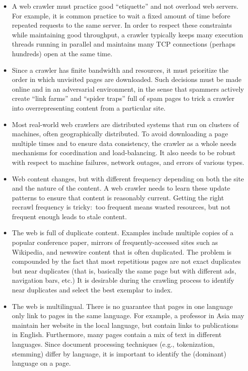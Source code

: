 \begin{itemize}

\item A web crawler must practice good ``etiquette'' and not overload
  web servers.  For example, it is common practice to wait a fixed
  amount of time before repeated requests to the same server.  In
  order to respect these constraints while maintaining good
  throughput, a crawler typically keeps many execution threads running
  in parallel and maintains many TCP connections (perhaps hundreds)
  open at the same time.

\item Since a crawler has finite bandwidth and resources, it must
  prioritize the order in which unvisited pages are downloaded.  Such
  decisions must be made online and in an adversarial environment, in
  the sense that spammers actively create ``link farms'' and ``spider
  traps'' full of spam pages to trick a crawler into overrepresenting
  content from a particular site.

\item Most real-world web crawlers are distributed systems that run on
  clusters of machines, often geographically distributed.  To avoid
  downloading a page multiple times and to ensure data consistency,
  the crawler as a whole needs mechanisms for coordination and
  load-balancing.  It also needs to be robust with respect to machine
  failures, network outages, and errors of various types.

\item Web content changes, but with different frequency depending on
  both the site and the nature of the content.  A web crawler needs to
  learn these update patterns to ensure that content is reasonably
  current.  Getting the right recrawl frequency is tricky:\ too
  frequent means wasted resources, but not frequent enough leads to
  stale content.

\item The web is full of duplicate content.  Examples include multiple
  copies of a popular conference paper, mirrors of frequently-accessed
  sites such as Wikipedia, and newswire content that is often
  duplicated.  The problem is compounded by the fact that most
  repetitious pages are not exact duplicates but near duplicates (that
  is, basically the same page but with different ads, navigation bars,
  etc.)  It is desirable during the crawling process to identify near
  duplicates and select the best exemplar to index.

\item The web is multilingual.  There is no guarantee that pages in
  one language only link to pages in the same language.  For example,
  a professor in Asia may maintain her website in the local language,
  but contain links to publications in English.  Furthermore, many
  pages contain a mix of text in different languages.  Since document
  processing techniques (e.g., tokenization, stemming) differ by
  language, it is important to identify the (dominant) language on a
  page.

\end{itemize}

